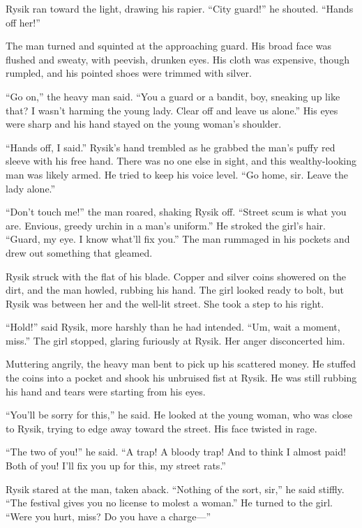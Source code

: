 \documentclass[10pt,b5paper]{article}
\begin{document}
Rysik ran toward the light, drawing his rapier. ``City guard!''
he shouted. ``Hands off her!''

The man turned and squinted at the approaching guard. His broad
face was flushed and sweaty, with peevish, drunken eyes. His cloth
was expensive, though rumpled, and his pointed shoes were trimmed
with silver.

``Go on,'' the heavy man said. ``You a guard or a bandit, boy, sneaking
up like that? I wasn't harming the young lady. Clear off and leave
us alone.'' His eyes were sharp and his hand stayed on the young
woman's shoulder.

``Hands off, I said.'' Rysik's hand trembled as he grabbed the man's
puffy red sleeve with his free hand. There was no one else in sight,
and this wealthy-looking man was likely armed. He tried to keep
his voice level. ``Go home, sir. Leave the lady alone.''

``Don't touch me!'' the man roared, shaking Rysik off. ``Street scum
is what you are. Envious, greedy urchin in a man's uniform.'' He
stroked the girl's hair. ``Guard, my eye. I know what'll fix you.''
The man rummaged in his pockets and drew out something that gleamed.

Rysik struck with the flat of his blade. Copper and silver coins
showered on the dirt, and the man howled, rubbing his hand. The girl
looked ready to bolt, but Rysik was between her and the well-lit
street. She took a step to his right.

``Hold!'' said Rysik, more harshly than he had intended. ``Um, wait
a moment, miss.'' The girl stopped, glaring furiously at Rysik. Her
anger disconcerted him.

Muttering angrily, the heavy man bent to pick up his scattered money.
He stuffed the coins into a pocket and shook his unbruised fist at
Rysik. He was still rubbing his hand and tears were starting from
his eyes.

``You'll be sorry for this,'' he said. He looked at the young woman,
who was close to Rysik, trying to edge away toward the street.
His face twisted in rage.

``The two of you!'' he said. ``A trap! A bloody trap! And to think I
almost paid! Both of you! I'll fix you up for this, my street rats.''

Rysik stared at the man, taken aback. ``Nothing of the sort, sir,'' he
said stiffly. ``The festival gives you no license to molest a woman.''
He turned to the girl. ``Were you hurt, miss? Do you have a charge---''
\end{document}
